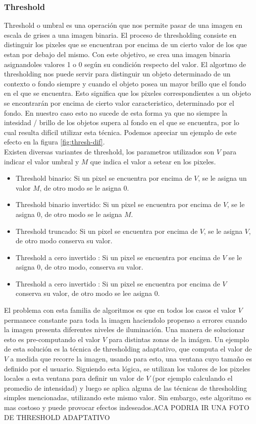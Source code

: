 	\subsubsection{Threshold}
Threshold o umbral es una operación que nos permite pasar de una imagen en escala de grises a una imagen binaria. El proceso de thresholding consiste en distinguir los pixeles que se encuentran por encima de un cierto valor de los que estan por debajo del mismo. Con este objetivo, se crea una imagen binaria asignandoles valores 1 o 0 según su condición respecto del valor. El algortmo de thresholding nos puede servir para distinguir un objeto determinado de un contexto o fondo siempre y cuando el objeto posea un mayor brillo que el fondo en el que se encuentra. Esto significa que los pixeles correspondientes a un objeto se encontrarán por encima de cierto valor caracteristico, determinado por el fondo. En nuestro caso esto no sucede de esta forma ya que no siempre la intesidad / brillo de los objetos supera al fondo en el que se encuentra, por lo cual resulta difícil utilizar esta técnica. Podemos apreciar un ejemplo de este efecto en la figura \ref{fig:thresh-dif}. \\
\indent Existen diversas variantes de threshold, los parametros utilizados son $V$ para indicar el valor umbral y $M$ que indica el valor a setear en los pixeles.
\begin{itemize}
\item{ Threshold binario:  Si un pixel se encuentra por encima de $V$, se le asigna un valor $M$, de otro modo se le asigna $0$.}
\item{ Threshold binario invertido:  Si un pixel se encuentra por encima de $V$, se le asigna 0, de otro modo se le asigna $M$.}
\item{ Threshold truncado:  Si un pixel se encuentra por encima de $V$, se le asigna $V$, de otro modo conserva su valor.}
\item{ Threshold a cero invertido : Si un pixel se encuentra por encima de $V$ se le asigna $0$, de otro modo, conserva su valor.}
\item{ Threshold a cero invertido : Si un pixel se encuentra por encima de $V$ conserva su valor, de otro modo se lee asigna $0$.}
\end{itemize}
El problema con esta familia de algoritmos es que en todos los casos el valor $V$ permanece constante para toda la imagen haciendolo propenso a errores cuando la imagen presenta diferentes niveles de iluminación. Una manera de solucionar esto es pre-computando el valor $V$ para distintas zonas de la imágen. Un ejemplo de esta solución es la técnica de thresholding adaptativo, que computa el valor de $V$ a medida que recorre la imagen, usando para esto, una ventana cuyo tamaño es definido por el usuario. Siguiendo esta lógica, se utilizan los valores de los pixeles locales a esta ventana para definir un valor de $V$ (por ejemplo calculando el promedio de intensidad) y luego se aplica alguna de las técnicas de thresholding simples mencionadas, utilizando este mismo valor. Sin embargo, este algoritmo es mas costoso y puede provocar efectos indeseados.ACA PODRIA IR UNA FOTO DE THRESHOLD ADAPTATIVO\\
